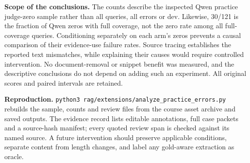 \textbf{Scope of the conclusions.}
The counts describe the inspected Qwen practice judge-zero sample rather than
all queries, all errors or dev. Likewise, 30/121 is the fraction of Qwen zeros
with full coverage, not the zero rate among all full-coverage queries.
Conditioning separately on each arm's zeros prevents a causal comparison of
their evidence-use failure rates.
Source tracing establishes the reported text mismatches, while explaining their
causes would require controlled intervention.
No document-removal or snippet benefit was measured, and the descriptive
conclusions do not depend on adding such an experiment.
All original scores and paired intervals are retained.

\textbf{Reproduction.}
\texttt{python3 rag/extensions/analyze\_practice\_errors.py} rebuilds the sample,
counts and review files from the course asset archive and saved outputs.
The evidence record lists editable annotations, full case packets and a
source-hash manifest; every quoted review span is checked against its named
source. A future intervention should preserve applicable conditions, separate
content from length changes, and label any gold-aware extraction as oracle.
